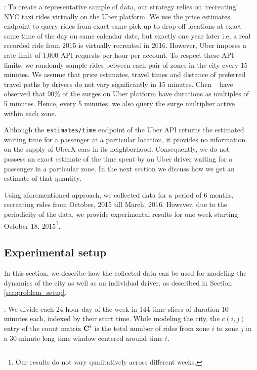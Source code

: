 :
To create a representative sample of data, our strategy relies on `recreating' NYC taxi rides virtually on the Uber platform. We use the price estimates endpoint to query rides from exact same pick-up to drop-off locations at exact same time of the day on same calendar date, but exactly one year later i.e, a real recorded ride from 2015 is virtually recreated in 2016. However, Uber imposes a rate limit of 1,000 API requests per hour per account. To respect these API limits, we randomly sample rides between each pair of zones in the city every 15 minutes. We assume that price estimates, travel times and distance of preferred travel paths by drivers do not vary significantly in 15 minutes. Chen {\etal}~\cite{chen2015peeking} have observed that 90\% of the surges on Uber platform have durations as multiples of 5 minutes. Hence, every 5 minutes, we also query the surge multiplier active within each zone.

Although the \texttt{estimates/time} endpoint of the Uber API returns the estimated waiting time for a passenger at a particular location, it provides no information on the supply of UberX cars in its neighborhood. Consequently, we do not possess an exact estimate of the time spent by an Uber driver waiting for a passenger in a particular zone. 
In the next section we discuss how we get an estimate of that quantity.
%

Using aforementioned approach, we collected data for a period of 6 months, recreating rides from October, 2015 till March, 2016. However, due to the periodicity of the data, we provide experimental results for one week starting October 18, 2015\footnote{Our results do not vary qualitatively across different weeks.}.

\subsection{Experimental setup}
In this section, we describe how the collected data can be used for modeling the dynamics of the city as well as an individual driver, as described in Section \ref{sec:problem_setup}.


:
We divide each 24-hour day of the week in 144 time-slices of duration 10 minutes each, indexed by their start time. While modeling the city, the $c(i,j)$ entry of the count matrix ${\mathbf{C}}^t$ is the total number of rides from zone $i$ to zone $j$ in a 30-minute long time window centered around time $t$. 

